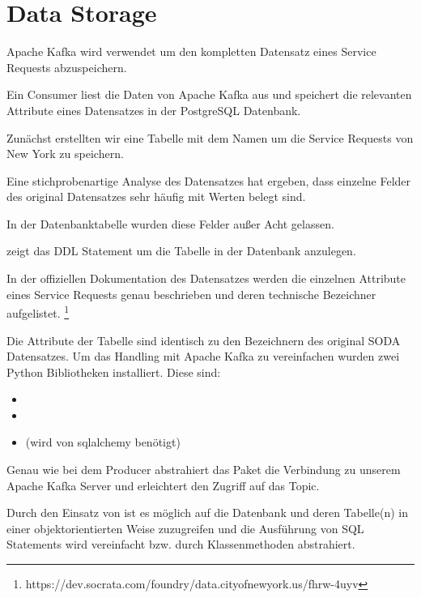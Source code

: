 \section{Data Storage}\label{sec:storage}
Apache Kafka wird verwendet um den kompletten Datensatz eines Service Requests abzuspeichern.

Ein Consumer liest die Daten von Apache Kafka aus und speichert die relevanten Attribute eines Datensatzes in der PostgreSQL Datenbank.

Zunächst erstellten wir eine Tabelle mit dem Namen  um die Service Requests von New York zu speichern.

Eine stichprobenartige Analyse des Datensatzes hat ergeben, dass einzelne Felder des original Datensatzes sehr häufig mit 
Werten belegt sind.

In der Datenbanktabelle  wurden diese Felder außer Acht gelassen.

 zeigt das \ac{DDL} Statement um die Tabelle  in der Datenbank anzulegen.



In der offiziellen Dokumentation des Datensatzes werden die einzelnen Attribute
eines Service Requests genau beschrieben und deren technische Bezeichner aufgelistet.
\footnote{https://dev.socrata.com/foundry/data.cityofnewyork.us/fhrw-4uyv}

Die Attribute der Tabelle  sind identisch zu den
Bezeichnern des original \ac{SODA} Datensatzes.
\newpage
Um das Handling mit Apache Kafka zu vereinfachen wurden zwei Python
Bibliotheken installiert.
Diese sind:

\begin{itemize}
  \item {}
  \item {}
  \item {} (wird von sqlalchemy benötigt)
\end{itemize}

Genau wie bei dem Producer abstrahiert das Paket  die Verbindung zu unserem Apache Kafka Server und erleichtert den Zugriff auf das Topic.

Durch den Einsatz von  ist es möglich auf die Datenbank und deren Tabelle(n) in einer objektorientierten Weise zuzugreifen
und die Ausführung von \ac{SQL} Statements wird vereinfacht bzw. durch Klassenmethoden abstrahiert.

